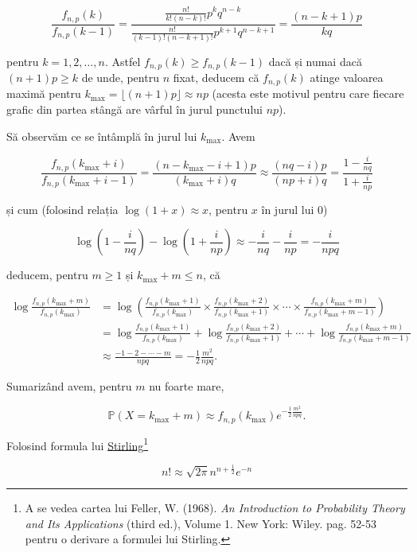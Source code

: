 \documentclass[]{article}
\let\rmarkdownfootnote\footnote%
\def\footnote{\protect\rmarkdownfootnote}
\begin{document}
\[
  \frac{f_{n,p}(k)}{f_{n,p}(k-1)} = \frac{\frac{n!}{k!(n-k)!}p^kq^{n-k}}{\frac{n!}{(k-1)!(n-k+1)!}p^{k+1}q^{n-k+1}} = \frac{(n-k+1)p}{kq}
\]

pentru \(k = 1,2,\ldots,n\). Astfel \(f_{n,p}(k)\geq f_{n,p}(k-1)\) dacă
și numai dacă \((n+1)p\geq k\) de unde, pentru \(n\) fixat, deducem că
\(f_{n,p}(k)\) atinge valoarea maximă pentru
\(k_{\max} = \lfloor{(n+1)p\rfloor}\approx np\) (acesta este motivul
pentru care fiecare grafic din partea stângă are vârful în jurul
punctului \(np\)).

Să observăm ce se întâmplă în jurul lui \(k_{\max}\). Avem

\[
\frac{f_{n,p}(k_{\max}+i)}{f_{n,p}(k_{\max}+i-1)} = \frac{(n-k_{\max}-i+1)p}{(k_{\max}+i)q}\approx \frac{(nq-i)p}{(np+i)q} = \frac{1-\frac{i}{nq}}{1+\frac{i}{np}}
\]

și cum (folosind relația \(\log(1+x)\approx x\), pentru \(x\) în jurul
lui \(0\))

\[
\log\left(1-\frac{i}{nq}\right) - \log\left(1+\frac{i}{np}\right) \approx -\frac{i}{nq}-\frac{i}{np} = -\frac{i}{npq}
\]

deducem, pentru \(m\geq 1\) și \(k_{\max}+m\leq n\), că

\begin{align*}
  \log\frac{f_{n,p}(k_{\max}+m)}{f_{n,p}(k_{\max})} &= \log\left(\frac{f_{n,p}(k_{\max}+1)}{f_{n,p}(k_{\max})}\times \frac{f_{n,p}(k_{\max}+2)}{f_{n,p}(k_{\max}+1)}\times\cdots\times\frac{f_{n,p}(k_{\max}+m)}{f_{n,p}(k_{\max}+m-1)}\right)\\
  &= \log\frac{f_{n,p}(k_{\max}+1)}{f_{n,p}(k_{\max})}+ \log\frac{f_{n,p}(k_{\max}+2)}{f_{n,p}(k_{\max}+1)}+\cdots+\log\frac{f_{n,p}(k_{\max}+m)}{f_{n,p}(k_{\max}+m-1)}\\
  &\approx \frac{-1-2-\cdots-m}{npq} = -\frac{1}{2}\frac{m^2}{npq}.
\end{align*}

Sumarizând avem, pentru \(m\) nu foarte mare,

\[
  \mathbb{P}(X=k_{\max}+m)\approx f_{n,p}(k_{\max})e^{-\frac{1}{2}\frac{m^2}{npq}}.
\]

Folosind formula lui
\href{https://en.wikipedia.org/wiki/Stirling\%27s_approximation}{Stirling}\footnote{A
  se vedea cartea lui Feller, W. (1968). \emph{An Introduction to
  Probability Theory and Its Applications} (third ed.), Volume 1. New
  York: Wiley. pag. 52-53 pentru o derivare a formulei lui Stirling.}

\[
  n!\approx \sqrt{2\pi}n^{n+\frac{1}{2}}e^{-n}
\]
\end{document}
